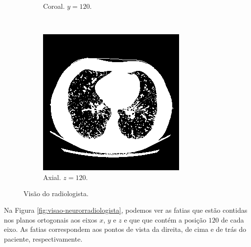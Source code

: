 \documentclass{article}
\begin{document}
\begin{figure}[H]
\begin{subfigure}[b]{0.3\textwidth}
        \caption{Coroal. $y = 120$.}
    \end{subfigure}
    ~
    \begin{subfigure}[b]{0.3\textwidth}
        \includegraphics[width=\textwidth]{thorax/radiologist-axial-gray.png}
        \caption{Axial. $z = 120$.}
    \end{subfigure}
    \caption{Visão do radiologista.}
    \label{fig:visao-radiologisa}
\end{figure}

Na Figura \ref{fig:visao-neurorradiologista}, podemos ver as fatias que estão contidas nos planos ortogonais aos eixos $x$, $y$ e $z$ e que que contém a posição $120$ de cada eixo. As fatias correspondem aos pontos de vista da direita, de cima e de trás do paciente, respectivamente.
\end{document}
